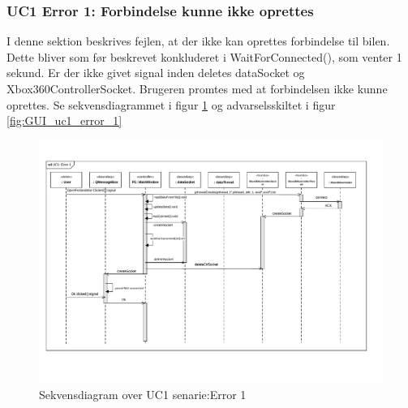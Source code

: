 \subsubsection{UC1 Error 1: Forbindelse kunne ikke oprettes}
I denne sektion beskrives fejlen, at der ikke kan oprettes forbindelse til bilen. Dette bliver som før beskrevet konkluderet i WaitForConnected(), som venter 1 sekund. Er der ikke givet signal inden deletes dataSocket og Xbox360ControllerSocket. Brugeren promtes med at forbindelsen ikke kunne oprettes. Se sekvensdiagrammet i figur \ref{fig:cd_uc1_error_1} og advarselsskiltet i figur \ref{fig:GUI_uc1_error_1}

\begin{figure}[H]
\centering
\includegraphics[width=\textwidth* 1,height=\textwidth* 1 ]{../fig/diagrammer/pc/sd_uc1_Error_1.pdf}
\caption{Sekvensdiagram over UC1 senarie:Error 1}
\label{fig:cd_uc1_error_1}
\end{figure}

